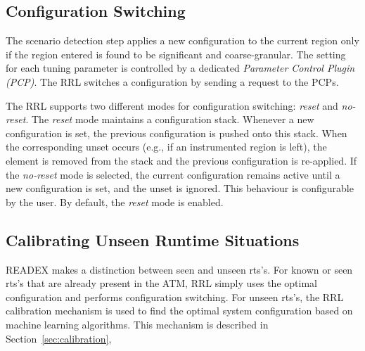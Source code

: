 \subsection{Configuration Switching}\label{config-switching}
The scenario detection step applies a new configuration to the current region only if the region entered is found to be significant and coarse-granular. The setting for each tuning parameter is controlled by a dedicated \textit{Parameter Control Plugin (PCP)}. The RRL switches a configuration by sending a request to the PCPs. 

The RRL supports two different modes for configuration switching: \textit{reset} and \textit{no-reset}. The \textit{reset} mode maintains a configuration stack. Whenever a new configuration is set, the previous configuration is pushed onto this stack. When the corresponding unset occurs (e.g., if an instrumented region is left), the element is removed from the stack and the previous configuration is re-applied. If the \textit{no-reset} mode is selected, the current configuration remains active until a new configuration is set, and the unset is ignored. This behaviour is configurable by the user. By default, the \textit{reset} mode is enabled.

\subsection{Calibrating Unseen Runtime Situations}\label{calibr}
READEX makes a distinction between seen and unseen rts's. For known or seen rts's that are already present in the ATM, RRL simply uses the optimal configuration and performs configuration switching. For unseen rts's, the RRL calibration mechanism is used to find the optimal system configuration based on machine learning algorithms. This mechanism is described in Section~\ref{sec:calibration},

 

 